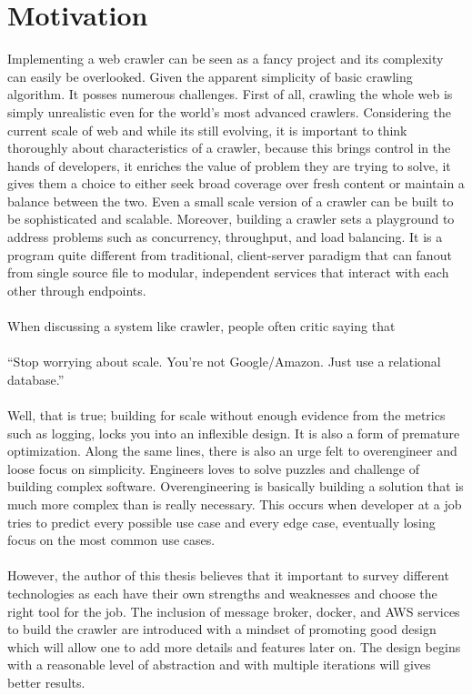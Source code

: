 \section{Motivation}
Implementing a web crawler can be seen as a fancy project and its complexity can easily be overlooked.
Given the apparent simplicity of basic crawling algorithm. It posses numerous challenges. First of all,
crawling the whole web is simply unrealistic even for the world's most advanced crawlers. Considering the
current scale of web and while its still evolving, it is important to think thoroughly about
characteristics of a crawler, because this brings control in the hands of developers, it enriches the
value of problem they are trying to solve, it gives them a choice to either seek broad coverage over fresh
content or maintain a balance between the two. Even a small scale version of a crawler can be built to
be sophisticated and scalable. Moreover, building a crawler sets a playground to address problems such
as concurrency, throughput, and load balancing. It is a program quite different from traditional,
client-server paradigm that can fanout from single source file to modular, independent services that interact with each other through endpoints. 
\\
\\
When discussing a system like crawler, people often critic saying that
\\
\\
``Stop worrying about scale. You're not Google/Amazon. Just use a relational database.''
\\
\\
Well, that is true; building for scale without enough evidence from the metrics such as logging, locks you into an inflexible design. It is also a form
of premature optimization. Along the same lines, there is also an urge felt to overengineer and loose
focus on simplicity. Engineers loves to solve puzzles and challenge of building complex software. Overengineering is basically building a solution that is much more complex than is really necessary. This occurs when developer at a job tries to predict every possible use case and every edge case, eventually losing focus on the most common use cases.  
\\
\\
However, the author of this thesis believes that it important to survey different technologies as each have
their own strengths and weaknesses and choose the right tool for the job. The inclusion of message broker, docker, and AWS services to build the crawler are introduced with a mindset of promoting good design which will allow one to add more details and features later on. The design begins with a reasonable level of abstraction and with multiple iterations will gives better results.


